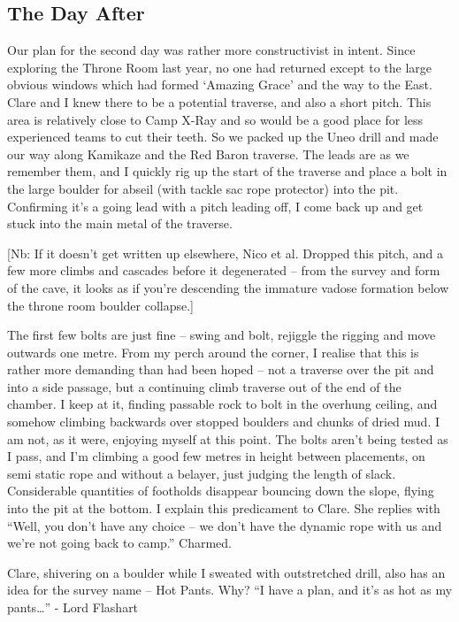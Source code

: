 \subsection{The Day After}\label{the-day-after}

Our plan for the second day was rather more constructivist in intent.
Since exploring the Throne Room last year, no one had returned except to
the large obvious windows which had formed `Amazing Grace' and the way
to the East. Clare and I knew there to be a potential traverse, and also
a short pitch. This area is relatively close to Camp X-Ray and so would
be a good place for less experienced teams to cut their teeth. So we
packed up the Uneo drill and made our way along Kamikaze and the Red
Baron traverse. The leads are as we remember them, and I quickly rig up
the start of the traverse and place a bolt in the large boulder for
abseil (with tackle sac rope protector) into the pit. Confirming it's a
going lead with a pitch leading off, I come back up and get stuck into
the main metal of the traverse.

{[}Nb: If it doesn't get written up elsewhere, Nico et al. Dropped this
pitch, and a few more climbs and cascades before it degenerated -- from
the survey and form of the cave, it looks as if you're descending the
immature vadose formation below the throne room boulder collapse.{]}

The first few bolts are just fine -- swing and bolt, rejiggle the
rigging and move outwards one metre. From my perch around the corner, I
realise that this is rather more demanding than had been hoped -- not a
traverse over the pit and into a side passage, but a continuing climb
traverse out of the end of the chamber. I keep at it, finding passable
rock to bolt in the overhung ceiling, and somehow climbing backwards
over stopped boulders and chunks of dried mud. I am not, as it were,
enjoying myself at this point. The bolts aren't being tested as I pass,
and I'm climbing a good few metres in height between placements, on semi
static rope and without a belayer, just judging the length of slack.
Considerable quantities of footholds disappear bouncing down the slope,
flying into the pit at the bottom. I explain this predicament to Clare.
She replies with ``Well, you don't have any choice -- we don't have the
dynamic rope with us and we're not going back to camp.'' Charmed.

Clare, shivering on a boulder while I sweated with outstretched drill,
also has an idea for the survey name -- Hot Pants. Why? ``I have a plan,
and it's as hot as my pants\ldots{}'' - Lord Flashart

